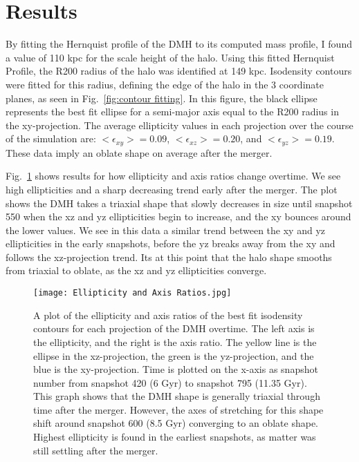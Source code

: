 \documentclass[fleqn,usenatbib]{mnras}
\begin{document}
\section{Results}

By fitting the Hernquist profile of the DMH to its computed mass profile, I found a value of 110 kpc for the scale height of the halo. Using this fitted Hernquist Profile, the R200 radius of the halo was identified at 149 kpc. Isodensity contours were fitted for this radius, defining the edge of the halo in the 3 coordinate planes, as seen in Fig.~\ref{fig:contour fitting}. In this figure, the black ellipse represents the best fit ellipse for a semi-major axis equal to the R200 radius in the xy-projection. The average ellipticity values in each projection over the course of the simulation are: \begin{math} <\epsilon_{xy}>=0.09\end{math}, \begin{math}<\epsilon_{xz}>=0.20\end{math}, and \begin{math}<\epsilon_{yz}>=0.19\end{math}. These data imply an oblate shape on average after the merger.

Fig.~\ref{fig:ellipticity} shows results for how ellipticity and axis ratios change overtime. We see high ellipticities and a sharp decreasing trend early after the merger. The plot shows the DMH takes a triaxial shape that slowly decreases in size until snapshot 550 when the xz and yz ellipticities begin to increase, and the xy bounces around the lower values. We see in this data a similar trend between the xy and yz ellipticities in the early snapshots, before the yz breaks away from the xy and follows the xz-projection trend. Its at this point that the halo shape smooths from triaxial to oblate, as the xz and yz ellipticities converge.


\begin{figure}
	\texttt{[image: Ellipticity and Axis Ratios.jpg]}
    \caption{A plot of the ellipticity and axis ratios of the best fit isodensity contours for each projection of the DMH overtime. The left axis is the ellipticity, and the right is the axis ratio. The yellow line is the ellipse in the xz-projection, the green is the yz-projection, and the blue is the xy-projection. Time is plotted on the x-axis as snapshot number from snapshot 420 (6 Gyr) to snapshot 795 (11.35 Gyr). This graph shows that the DMH shape is generally triaxial through time after the merger. However, the axes of stretching for this shape shift around snapshot 600 (8.5 Gyr) converging to an oblate shape. Highest ellipticity is found in the earliest snapshots, as matter was still settling after the merger.}
    \label{fig:ellipticity}
\end{figure}
\end{document}
